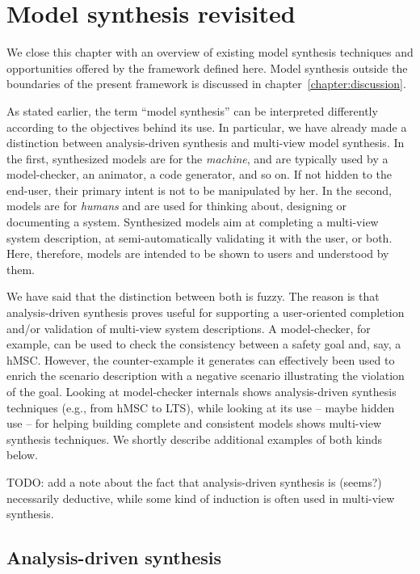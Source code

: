 \section{Model synthesis revisited\label{section:background-discussion}}

We close this chapter with an overview of existing model synthesis techniques and opportunities offered by the framework defined here. Model synthesis outside the boundaries of the present framework is discussed in chapter~\ref{chapter:discussion}.

As stated earlier, the term ``model synthesis'' can be interpreted differently according to the objectives behind its use. In particular, we have already made a distinction between analysis-driven synthesis and multi-view model synthesis. In the first, synthesized models are for the \emph{machine}, and are typically used by a model-checker, an animator, a code generator, and so on. If not hidden to the end-user, their primary intent is not to be manipulated by her. In the second, models are for \emph{humans} and are used for thinking about, designing or documenting a system. Synthesized models aim at completing a multi-view system description, at semi-automatically validating it with the user, or both. Here, therefore, models are intended to be shown to users and understood by them.

We have said that the distinction between both is fuzzy. The reason is that analysis-driven synthesis proves useful for supporting a user-oriented completion and/or validation of multi-view system descriptions. A model-checker, for example, can be used to check the consistency between a safety goal and, say, a hMSC. However, the counter-example it generates can effectively been used to enrich the scenario description with a negative scenario illustrating the violation of the goal. Looking at model-checker internals shows analysis-driven synthesis techniques (e.g., from hMSC to LTS), while looking at its use -- maybe hidden use -- for helping building complete and consistent models shows multi-view synthesis techniques. We shortly describe additional examples of both kinds below.

TODO: add a note about the fact that analysis-driven synthesis is (seems?) necessarily deductive, while some kind of induction is often used in multi-view synthesis.

\subsection*{Analysis-driven synthesis}

